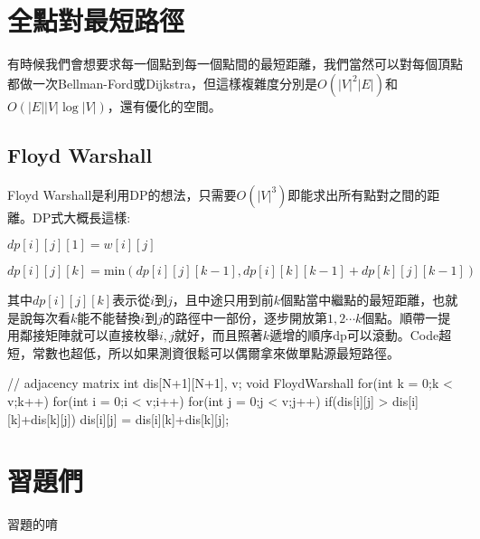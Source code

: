 \section{全點對最短路徑}
有時候我們會想要求每一個點到每一個點間的最短距離，我們當然可以對每個頂點都做一次Bellman-Ford或Dijkstra，但這樣複雜度分別是$O(|V|^2|E|)$和$O(|E||V|\log|V|)$，還有優化的空間。
\subsection{Floyd Warshall}
Floyd Warshall是利用DP的想法，只需要$O(|V|^3)$即能求出所有點對之間的距離。DP式大概長這樣: 
\begin{center} $dp[i][j][1] = w[i][j]$ \end{center}
\begin{center} $dp[i][j][k] = \text{min}(dp[i][j][k-1], dp[i][k][k-1]+dp[k][j][k-1])$ \end{center}
其中$dp[i][j][k]$表示從$i$到$j$，且中途只用到前$k$個點當中繼點的最短距離，也就是說每次看$k$能不能替換$i$到$j$的路徑中一部份，逐步開放第$1,2\cdots k$個點。順帶一提用鄰接矩陣就可以直接枚舉$i,j$就好，而且照著$k$遞增的順序dp可以滾動。Code超短，常數也超低，所以如果測資很鬆可以偶爾拿來做單點源最短路徑。
\begin{C++}
// adjacency matrix
int dis[N+1][N+1], v;
void FloydWarshall{
	for(int k = 0;k < v;k++)
		for(int i = 0;i < v;i++)
			for(int j = 0;j < v;j++)
				if(dis[i][j] > dis[i][k]+dis[k][j])
					dis[i][j] = dis[i][k]+dis[k][j];
}
\end{C++}

\section*{習題們}
習題的唷

